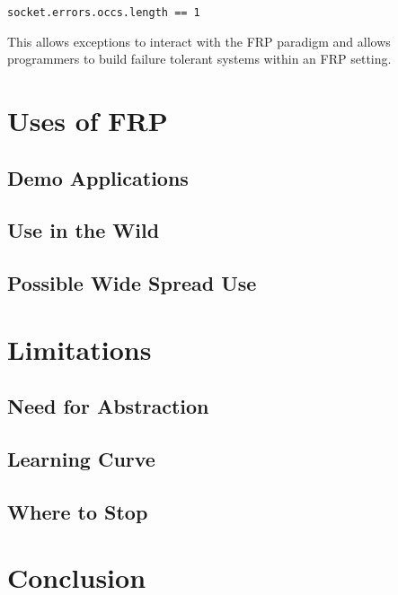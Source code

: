 \documentclass[12pt]{article}
\begin{document}
\begin{verbatim}
socket.errors.occs.length == 1 
\end{verbatim}

    This allows exceptions to interact with the FRP paradigm and allows programmers to build failure tolerant systems within 
    an FRP setting.
    
  \section{Uses of FRP}
  
    \subsection{Demo Applications}
    
    \subsection{Use in the Wild}
    
    \subsection{Possible Wide Spread Use}
    
  \section{Limitations}
    
    \subsection{Need for Abstraction}
      
    \subsection{Learning Curve}
    
    \subsection{Where to Stop}
      
  \section{Conclusion}
  
\end{document}
